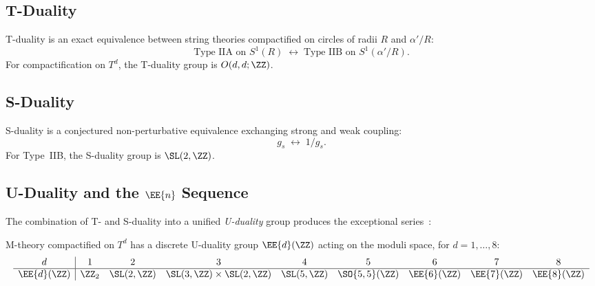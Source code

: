 \subsection{T-Duality}

\begin{definition}[T-Duality]
\label{def:t_duality}
T-duality is an exact equivalence between string theories compactified on
circles of radii $R$ and $\alpha'/R$:
\begin{equation}
\text{Type IIA on } S^1(R) \;\longleftrightarrow\;
\text{Type IIB on } S^1(\alpha'/R).
\end{equation}
For compactification on $T^d$, the T-duality group is $O(d,d;\ZZ)$.
\end{definition}

\subsection{S-Duality}

\begin{definition}[S-Duality]
\label{def:s_duality}
S-duality is a conjectured non-perturbative equivalence exchanging strong
and weak coupling:
\begin{equation}
g_s \;\longleftrightarrow\; 1/g_s.
\end{equation}
For Type~IIB, the S-duality group is $\SL(2,\ZZ)$.
\end{definition}

\subsection{U-Duality and the $\EE{n}$ Sequence}

The combination of T- and S-duality into a unified \emph{U-duality} group
produces the exceptional series~\cite{hull1995unity}:

\begin{theorem}
\label{thm:u_duality}
M-theory compactified on $T^d$ has a discrete U-duality group
$\EE{d}(\ZZ)$ acting on the moduli space, for $d = 1, \ldots, 8$:
\begin{equation}
\label{eq:u_duality_table}
\begin{array}{c|cccccccc}
d & 1 & 2 & 3 & 4 & 5 & 6 & 7 & 8 \\
\hline
\EE{d}(\ZZ) & \ZZ_2 & \SL(2,\ZZ) & \SL(3,\ZZ)\times\SL(2,\ZZ) &
\SL(5,\ZZ) & \SO{5,5}(\ZZ) & \EE{6}(\ZZ) & \EE{7}(\ZZ) & \EE{8}(\ZZ)
\end{array}
\end{equation}
\end{theorem}

